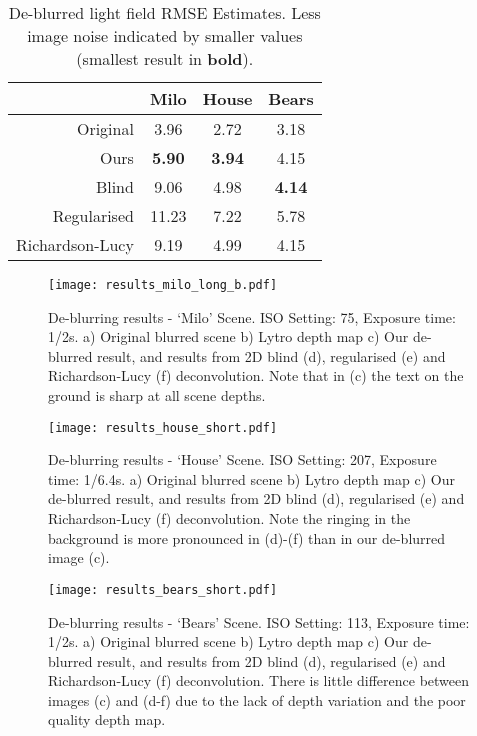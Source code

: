 \begin{table}[h]
\centering
\caption[De-blurred light field RMSE Estimates]{
De-blurred light field RMSE Estimates.
Less image noise indicated by smaller values (smallest result in \textbf{bold}).
}
\label{tab:deblurred_light_field_rmse_estimates}
\begin{tabular}[h]{r | c c c}
                & Milo           & House         & Bears         \\
\hline
Original        & 3.96           & 2.72          & 3.18          \\
Ours            & \textbf{5.90}  & \textbf{3.94} & 4.15          \\
Blind           & 9.06           & 4.98          & \textbf{4.14} \\
Regularised     & 11.23          & 7.22          & 5.78          \\
Richardson-Lucy & 9.19           & 4.99          & 4.15          \\
\end{tabular}
\end{table}


\begin{figure}[h]
\centering
\texttt{[image: results\_milo\_long\_b.pdf]}
\caption[De-blurring results - \enquote*{Milo} Scene]{
De-blurring results - \enquote*{Milo} Scene.
ISO Setting: 75, Exposure time: 1/2s.
a) Original blurred scene b) Lytro depth map c) Our de-blurred result, and results from 2D blind (d), regularised (e) and Richardson-Lucy (f) deconvolution.
Note that in (c) the text on the ground is sharp at all scene depths.
}
\label{fig:results_milo_long_b}
\end{figure}

\begin{figure}[h]
\centering
\texttt{[image: results\_house\_short.pdf]}
\caption[De-blurring results - \enquote*{House} Scene]{
De-blurring results - \enquote*{House} Scene.
ISO Setting: 207, Exposure time: 1/6.4s.
a) Original blurred scene b) Lytro depth map c) Our de-blurred result, and results from 2D blind (d), regularised (e) and Richardson-Lucy (f) deconvolution.
Note the ringing in the background is more pronounced in (d)-(f) than in our de-blurred image (c).
}
\label{fig:results_house_short}
\end{figure}

\begin{figure}[h]
\centering
\texttt{[image: results\_bears\_short.pdf]}
\caption[De-blurring results - \enquote*{Bears} Scene]{
De-blurring results - \enquote*{Bears} Scene.
ISO Setting: 113, Exposure time: 1/2s.
a) Original blurred scene b) Lytro depth map c) Our de-blurred result, and results from 2D blind (d), regularised (e) and Richardson-Lucy (f) deconvolution.
There is little difference between images (c) and (d-f) due to the lack of depth variation and the poor quality depth map.
}
\label{fig:results_bears_short}
\end{figure}



